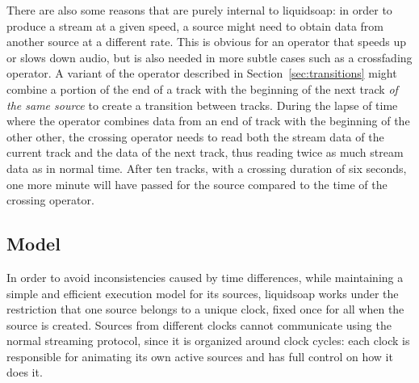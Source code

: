 There are also some reasons that are purely internal to liquidsoap:
in order to produce a stream at a given speed,
a source might need to obtain data from another source at
a different rate. This is obvious for an operator that speeds up or
slows down audio, but is also needed in more subtle cases
such as a crossfading operator. A variant of the operator described
in Section~\ref{sec:transitions} might combine a portion
of the end of a track with the beginning of the next track
\emph{of the same source} to create a transition between tracks.
During the lapse of time where the operator combines data from an end of track
with the beginning of the other other, the crossing operator needs to read both
the stream data of the current track and the data of the next track, thus
reading twice as much stream data as in normal time.
After ten tracks,
with a crossing duration of six seconds, one more minute will have
passed for the source compared to the time of the crossing operator.

\subsection{Model}

In order to avoid inconsistencies caused by time differences,
while maintaining a simple and efficient execution model for
its sources, liquidsoap works under the restriction that
one source belongs to a unique clock,
fixed once for all when the source is created.
Sources from different clocks cannot communicate using the normal
streaming protocol, since it is organized around clock cycles:
each clock is responsible for animating its own active sources
and has full control on how it does it.

